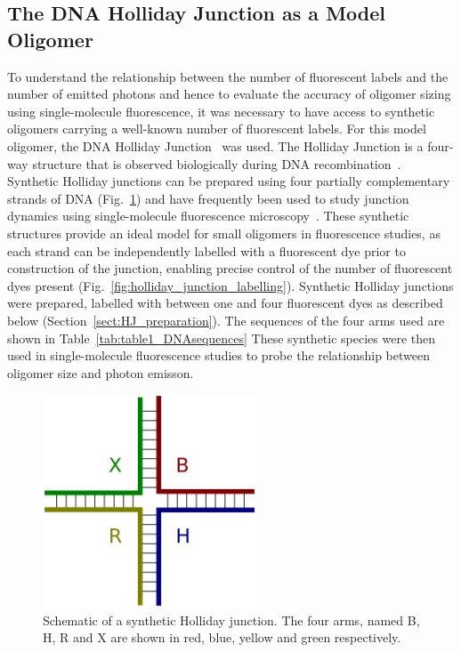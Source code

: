\subsection{The DNA Holliday Junction as a Model Oligomer}
To understand the relationship between the number of fluorescent labels and the number of emitted photons and hence to evaluate the accuracy of oligomer sizing using single-molecule fluorescence, it was necessary to have access to synthetic oligomers carrying a well-known number of fluorescent labels. For this model oligomer, the DNA Holliday Junction~\cite{holliday1964} was used. The Holliday Junction is a four-way structure that is observed biologically during DNA recombination~\cite{potter1976}. Synthetic Holliday junctions can be prepared using four partially complementary strands of DNA (Fig.~\ref{fig:holliday_junction}) and have frequently been used to study junction dynamics using single-molecule fluorescence microscopy~\cite{mckinney03, uphoff2010, Hyeon2012}. These synthetic structures provide an ideal model for small oligomers in fluorescence studies, as each strand can be independently labelled with a fluorescent dye prior to construction of the junction, enabling precise control of the number of fluorescent dyes present (Fig.~\ref{fig:holliday_junction_labelling}). Synthetic Holliday junctions were prepared, labelled with between one and four fluorescent dyes as described below (Section~\ref{sect:HJ_preparation}). The sequences of the four arms used are shown in Table~\ref{tab:table1_DNAsequences} These synthetic species were then used in single-molecule fluorescence studies to probe the relationship between oligomer size and photon emisson.

\begin{figure}
   \begin{center}
      \includegraphics*[clip=true, width=2.5in]{sizing/holliday_junction.pdf}
      \caption{Schematic of a synthetic Holliday junction. The four arms, named B, H, R and X are shown in red, blue, yellow and green respectively.}
      \label{fig:holliday_junction}
   \end{center}
\end{figure}

